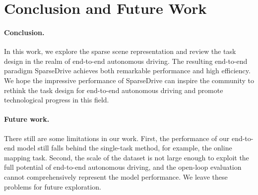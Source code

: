 \section{Conclusion and Future Work} \label{conclusion}

\paragraph{Conclusion.} In this work, we explore the sparse scene representation and review the task design in the realm of end-to-end autonomous driving. The resulting end-to-end paradigm SparseDrive achieves both remarkable performance and high efficiency. We hope the impressive performance of SparseDrive can inspire the community to rethink the task design for end-to-end autonomous driving and promote technological progress in this field.

\paragraph{Future work.} There still are some limitations in our work. First, the performance of our end-to-end model still falls behind the single-task method, for example, the online mapping task. Second, the scale of the dataset is not large enough to exploit the full potential of end-to-end autonomous driving, and the open-loop evaluation cannot comprehensively represent the model performance. We leave these problems for future exploration.